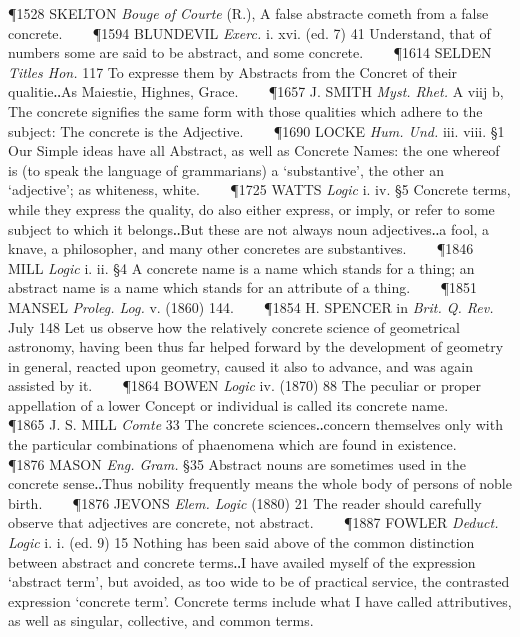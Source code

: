 \begin{description}[wide, labelwidth=!, labelindent=0pt]
\begin{myenumerate}
\P 1528 SKELTON  \textit{Bouge of Courte} (R.), A false abstracte cometh from a false concrete.    
\P 1594 BLUNDEVIL  \textit{Exerc.} i. xvi. (ed. 7) 41 Understand, that of numbers some are said to be abstract, and some concrete.    
\P 1614 SELDEN  \textit{Titles Hon.} 117 To expresse them by Abstracts from the Concret of their qualitie‥As Maiestie, Highnes, Grace.    
\P 1657 J. SMITH  \textit{Myst. Rhet.} A viij b, The concrete signifies the same form with those qualities which adhere to the subject: The concrete is the Adjective.    
\P 1690 LOCKE  \textit{Hum. Und.} iii. viii. §1 Our Simple ideas have all Abstract, as well as Concrete Names: the one whereof is (to speak the language of grammarians) a ‘substantive’, the other an ‘adjective’; as whiteness, white.    
\P 1725 WATTS  \textit{Logic} i. iv. §5 Concrete terms, while they express the quality, do also either express, or imply, or refer to some subject to which it belongs‥But these are not always noun adjectives‥a fool, a knave, a philosopher, and many other concretes are substantives.    
\P 1846 MILL  \textit{Logic} i. ii. §4 A concrete name is a name which stands for a thing; an abstract name is a name which stands for an attribute of a thing.    
\P 1851 MANSEL  \textit{Proleg. Log.} v. (1860) 144.    
\P 1854 H. SPENCER in  \textit{Brit. Q. Rev.} July 148 Let us observe how the relatively concrete science of geometrical astronomy, having been thus far helped forward by the development of geometry in general, reacted upon geometry, caused it also to advance, and was again assisted by it.    
\P 1864 BOWEN  \textit{Logic} iv. (1870) 88 The peculiar or proper appellation of a lower Concept or individual is called its concrete name.    
\P 1865 J. S. MILL  \textit{Comte} 33 The concrete sciences‥concern themselves only with the particular combinations of phaenomena which are found in existence.    
\P 1876 MASON  \textit{Eng. Gram.} §35 Abstract nouns are sometimes used in the concrete sense‥Thus nobility frequently means the whole body of persons of noble birth.    
\P 1876 JEVONS  \textit{Elem. Logic} (1880) 21 The reader should carefully observe that adjectives are concrete, not abstract.    
\P 1887 FOWLER  \textit{Deduct. Logic} i. i. (ed. 9) 15 Nothing has been said above of the common distinction between abstract and concrete terms‥I have availed myself of the expression ‘abstract term’, but avoided, as too wide to be of practical service, the contrasted expression ‘concrete term’. Concrete terms include what I have called attributives, as well as singular, collective, and common terms.


\end{myenumerate}
\end{description}
